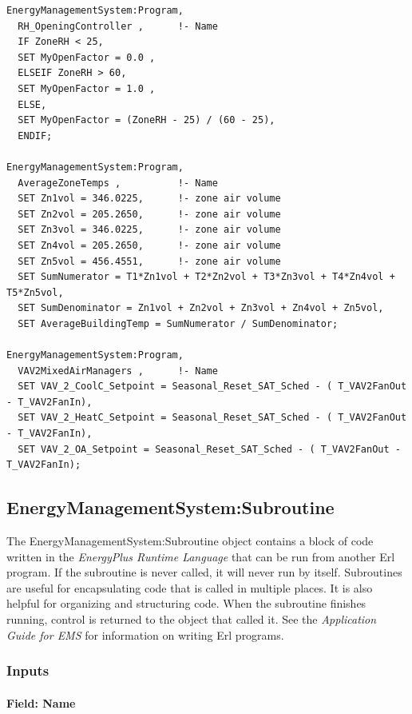 \begin{lstlisting}
EnergyManagementSystem:Program,
  RH_OpeningController ,      !- Name
  IF ZoneRH < 25,
  SET MyOpenFactor = 0.0 ,
  ELSEIF ZoneRH > 60,
  SET MyOpenFactor = 1.0 ,
  ELSE,
  SET MyOpenFactor = (ZoneRH - 25) / (60 - 25),
  ENDIF;

EnergyManagementSystem:Program,
  AverageZoneTemps ,          !- Name
  SET Zn1vol = 346.0225,      !- zone air volume
  SET Zn2vol = 205.2650,      !- zone air volume
  SET Zn3vol = 346.0225,      !- zone air volume
  SET Zn4vol = 205.2650,      !- zone air volume
  SET Zn5vol = 456.4551,      !- zone air volume
  SET SumNumerator = T1*Zn1vol + T2*Zn2vol + T3*Zn3vol + T4*Zn4vol + T5*Zn5vol,
  SET SumDenominator = Zn1vol + Zn2vol + Zn3vol + Zn4vol + Zn5vol,
  SET AverageBuildingTemp = SumNumerator / SumDenominator;

EnergyManagementSystem:Program,
  VAV2MixedAirManagers ,      !- Name
  SET VAV_2_CoolC_Setpoint = Seasonal_Reset_SAT_Sched - ( T_VAV2FanOut - T_VAV2FanIn),
  SET VAV_2_HeatC_Setpoint = Seasonal_Reset_SAT_Sched - ( T_VAV2FanOut - T_VAV2FanIn),
  SET VAV_2_OA_Setpoint = Seasonal_Reset_SAT_Sched - ( T_VAV2FanOut - T_VAV2FanIn);
\end{lstlisting}

\subsection{EnergyManagementSystem:Subroutine}\label{energymanagementsystemsubroutine}

The EnergyManagementSystem:Subroutine object contains a block of code written in the \emph{EnergyPlus Runtime Language} that can be run from another Erl program. If the subroutine is never called, it will never run by itself. Subroutines are useful for encapsulating code that is called in multiple places. It is also helpful for organizing and structuring code. When the subroutine finishes running, control is returned to the object that called it. See the \emph{Application Guide for EMS} for information on writing Erl programs.

\subsubsection{Inputs}\label{inputs-4-010}

\paragraph{Field: Name}\label{field-name-4-009}


